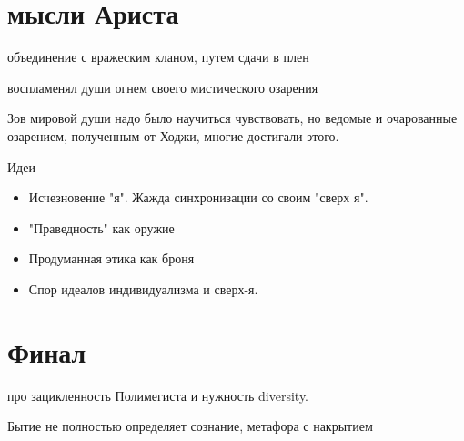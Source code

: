 \documentclass[12pt,a4paper]{article}
\begin{document}
\section*{мысли Ариста}



объединение с вражеским кланом, путем сдачи в плен

воспламенял души огнем своего мистического озарения

Зов мировой души надо было научиться чувствовать, но ведомые и очарованные озарением, полученным от Ходжи, многие достигали этого.


Идеи
\begin{itemize}
	\item Исчезновение "я". Жажда синхронизации со своим "сверх я".
	\item "Праведность" как оружие
	\item Продуманная этика как броня
	\item Спор идеалов индивидуализма и сверх-я. 
\end{itemize}


\section*{Финал}

про зацикленность Полимегиста и нужность diversity.

Бытие не полностью определяет сознание, метафора с накрытием
\end{document}

